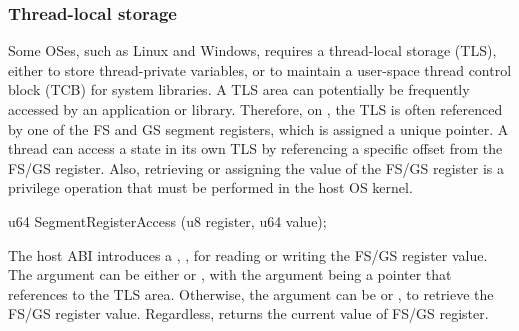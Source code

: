 

\subsubsection*{Thread-local storage}


Some OSes, such as Linux and Windows, requires a thread-local storage (TLS),
either to store thread-private variables, or to maintain a user-space
thread control block (TCB) for system libraries.
A TLS area can potentially be frequently accessed by an application or library.
Therefore, on \graphenearch{},
the TLS is often referenced by one of the FS and GS segment registers,
which is assigned a unique pointer.
A thread can access a state in its own TLS by referencing a specific offset from the FS/GS register.
Also, retrieving or assigning the value of the FS/GS register
is a privilege operation
that must be performed in the host OS kernel.







\begin{paldef}
u64 SegmentRegisterAccess (u8 register, u64 value);
\end{paldef}




The host ABI introduces a \hostapi{}, , for reading or writing the FS/GS register value.
The  argument can be either  or ,
with the  argument
being a pointer that references to the TLS area.
Otherwise, the  argument
can be  or ,
to retrieve the FS/GS register value.
Regardless,  returns the current value of FS/GS register.



